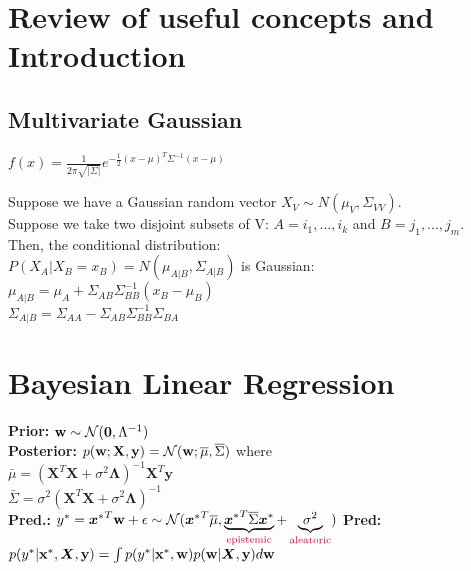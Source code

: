 \section{Review of useful concepts and Introduction}
\subsection{Multivariate Gaussian}
$f(x) = \frac{1}{2\pi \sqrt{|\Sigma|}} e^{- \frac{1}{2} (x-\mu)^T \Sigma^{-1} (x-\mu)}$

Suppose we have a Gaussian random vector $X_V \sim N(\mu_V, \Sigma_{VV})$.\\
Suppose we take two disjoint subsets of V: $A={i_1,...,i_k}$ and $B={j_1,...,j_m}$.\\
Then, the conditional distribution: \\
$P(X_A|X_B=x_B)=N(\mu_{A|B}, \Sigma_{A|B})$ is Gaussian:\\
$\mu_{A|B}=\mu_A+\Sigma_{AB}\Sigma^{-1}_{BB}(x_B-\mu_B)$\\
$\Sigma_{A|B}=\Sigma_{AA}-\Sigma_{AB}\Sigma^{-1}_{BB}\Sigma_{BA}$

\section{Bayesian Linear Regression}
\textbf{Prior:} ${\mathbf{w}}\sim\mathcal{N}(\mathbf{0},\Lambda^{-1})$\\
\textbf{Posterior:} $p({\mathbf{w}};\mathbf{X},\mathbf{y}) = \mathcal{N}({\mathbf{w}}; \overline\mu, \overline\Sigma)$ where\\
$\bar\mu = (\mathbf{X}^T\mathbf{X} +\sigma^2\bm{\Lambda})^{-1}\mathbf{X}^T\mathbf{y}$\\
$\bar\Sigma = \sigma^2(\mathbf{X}^T\mathbf{X} +\sigma^2\bm{\Lambda})^{-1}$\\
\textbf{Pred.:}
\mbox{$y^* = {{\bm{x}}^*}^T{\mathbf{w}} + \epsilon\sim \mathcal{N}({{\bm{x}}^*}^T\overline\mu, \underbrace{{{\bm{x}}^*}^T\overline\Sigma{{\bm{x}}^*}}_\text{\color{purple}epistemic}+\underbrace{\sigma^2}_\text{\color{purple}aleatoric})$}
\textbf{\color{gray}Pred:}
$p(y^*|{\mathbf{x}}^*,{\bm{X}},{\mathbf{y}}) = \int p(y^*|{\mathbf{x}}^*,{\mathbf{w}})p({\mathbf{w}}|{\bm{X}},{\mathbf{y}}) d{\mathbf{w}}$

